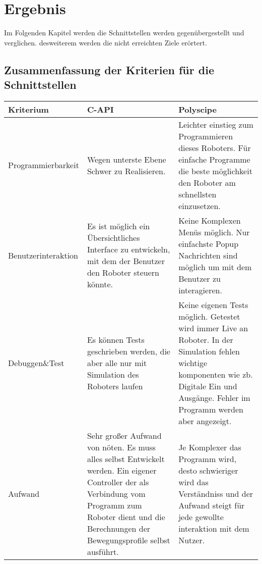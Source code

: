 \chapter{Ergebnis}
\label{sec:ErreichteErgebnisse}

Im Folgenden Kapitel werden die Schnittstellen werden gegenübergestellt und verglichen. desweiterem werden die nicht erreichten Ziele erörtert.

\section{Zusammenfassung der Kriterien für die Schnittstellen}
\label{sec:vgl_schnittstellen}

\begin{minipage}[h]
 {\textwidth}
  \begin{tabular}{|p{}|p{}|p{}|}
   \hline
   	\textbf{Kriterium} & \textbf{C-API} & \textbf{Polyscipe} \\ \hline \hline 
      Programmierbarkeit & Wegen unterste Ebene Schwer zu Realisieren. & Leichter einstieg zum Programmieren dieses Roboters. Für einfache Programme die beste möglichkeit den Roboter am schnellsten einzusetzen.
     \\ 
     \hline 
     Benutzerinteraktion &  Es ist möglich ein Übersichtliches Interface zu entwickeln, mit dem der Benutzer den Roboter steuern könnte. & 
     Keine Komplexen Menüs möglich. Nur einfachste Popup Nachrichten sind möglich um mit dem Benutzer zu interagieren.
     \\ 
     \hline  
     Debuggen\&Test & Es können Tests geschrieben werden, die aber alle nur mit Simulation des Roboters laufen & Keine eigenen Tests möglich. Getestet wird immer Live an Roboter. In der Simulation fehlen wichtige komponenten wie zb. Digitale Ein und Ausgänge. Fehler im Programm werden aber angezeigt.
     \\ 
     \hline 
     Aufwand & Sehr großer Aufwand von nöten. Es muss alles selbst Entwickelt werden. Ein eigener Controller der als Verbindung vom Programm zum Roboter dient und die Berechnungen der Bewegungsprofile selbst ausführt. & Je Komplexer das Programm wird, desto schwieriger wird das Verständniss und der Aufwand steigt für jede gewollte interaktion mit dem Nutzer.
     \\ 
     \hline 
  \end{tabular}
 \label{tab:vgl_interfaces}
\end{minipage}

